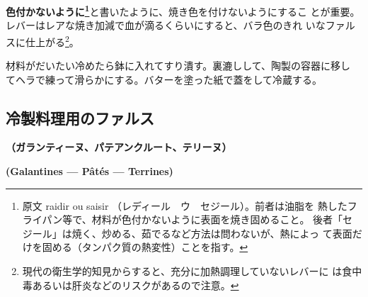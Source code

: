 \begin{recette}
\textbf{色付かないように\footnote{原文 raidir ou saisir
  （レディール　ウ　セジール）。前者は油脂を
  熱したフライパン等で、材料が色付かないように表面を焼き固めること。
  後者「セジール」は焼く、炒める、茹でるなど方法は問わないが、熱によっ
  て表面だけを固める（タンパク質の熱変性）ことを指す。}}と書いたように、焼き色を付けないようにするこ
とが重要。レバーはレアな焼き加減で血が滴るくらいにすると、バラ色のきれ
いなファルスに仕上がる\footnote{現代の衛生学的知見からすると、充分に加熱調理していないレバーに
  は食中毒あるいは肝炎などのリスクがあるので注意。}。

材料がだいたい冷めたら鉢に入れてすり潰す。裏漉しして、陶製の容器に移し
てヘラで練って滑らかにする。バターを塗った紙で蓋をして冷蔵する。
\end{recette}
\hypertarget{farce-pour-les-pieces-froides}{%
\subsection{冷製料理用のファルス}\label{farce-pour-les-pieces-froides}}

\vspace{-1\zw}
\begin{center}
\textbf{（ガランティーヌ、パテアンクルート、テリーヌ）}
\end{center}
\vspace{1\zw}
\begin{center}
\vspace{-1\zw}
\hspace{1\zw}\textbf{(Galantines --- Pâtés --- Terrines)}
\end{center}


